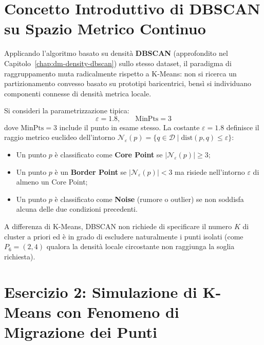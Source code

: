\FloatBarrier
\section{Concetto Introduttivo di DBSCAN su Spazio Metrico Continuo}
\label{sec:dm-dbscan-simulation-intro}

Applicando l'algoritmo basato su densità \textbf{DBSCAN} (approfondito nel Capitolo~\ref{chap:dm-density-dbscan}) sullo stesso dataset, il paradigma di raggruppamento muta radicalmente rispetto a K-Means: non si ricerca un partizionamento convesso basato su prototipi baricentrici, bensì si individuano componenti connesse di densità metrica locale.

Si consideri la parametrizzazione tipica:
\begin{equation}
\varepsilon = 1.8, \qquad \text{MinPts} = 3
\end{equation}
dove $\text{MinPts} = 3$ include il punto in esame stesso.
La costante $\varepsilon = 1.8$ definisce il raggio metrico euclideo dell'intorno $\mathcal{N}_\varepsilon(p) = \{q \in \mathcal{D} \mid \mathrm{dist}(p, q) \le \varepsilon\}$:
\begin{itemize}
    \item Un punto $p$ è classificato come \textbf{Core Point} se $|\mathcal{N}_\varepsilon(p)| \ge 3$;
    \item Un punto $p$ è un \textbf{Border Point} se $|\mathcal{N}_\varepsilon(p)| < 3$ ma risiede nell'intorno $\varepsilon$ di almeno un Core Point;
    \item Un punto $p$ è classificato come \textbf{Noise} (rumore o outlier) se non soddisfa alcuna delle due condizioni precedenti.
\end{itemize}

A differenza di K-Means, DBSCAN non richiede di specificare il numero $K$ di cluster a priori ed è in grado di escludere naturalmente i punti isolati (come $P_6 = (2,4)$ qualora la densità locale circostante non raggiunga la soglia richiesta).

\FloatBarrier
\section{Esercizio 2: Simulazione di K-Means con Fenomeno di Migrazione dei Punti}
\label{sec:dm-kmeans-exercise-2}

